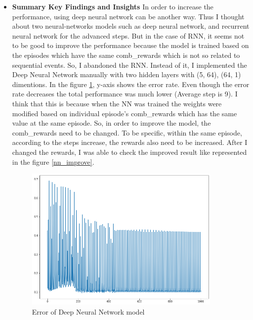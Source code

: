 \documentclass[12pt]{article}
\begin{document}
\begin{itemize}
\item \textbf{Summary Key Findings and Insights}
In order to increase the performance, using deep neural network can be another way. Thus I thought about two neural-networks models such as deep neural network, and recurrent neural network for the advanced steps. But in the case of RNN, it seems not to be good to improve the performance because the model is trained based on the episodes which have the same comb\_rewards which is not so related to sequential events. So, I abandoned the RNN. Instead of it, I implemented the Deep Neural Network manually with two hidden layers with (5, 64), (64, 1) dimentions. In the figure \ref{nn}, y-axis shows the error rate. Even though the error rate decreases the total performance was much lower (Average step is 9). I think that this is because when the NN was trained the weights were modified based on individual episode's comb\_rewards which has the same value at the same episode. So, in order to improve the model, the comb\_rewards need to be changed. To be specific, within the same episode, according to the steps increase, the rewards also need to be increased. After I changed the rewards, I was able to check the improved result like represented in the figure \ref{nn_improve}.

\begin{figure}[H]
  \centering
  \includegraphics[width=0.9\textwidth]{figures/nn.png}
  \caption{Error of Deep Neural Network model}\label{nn}
\end{figure}


\end{itemize}
\end{document}
